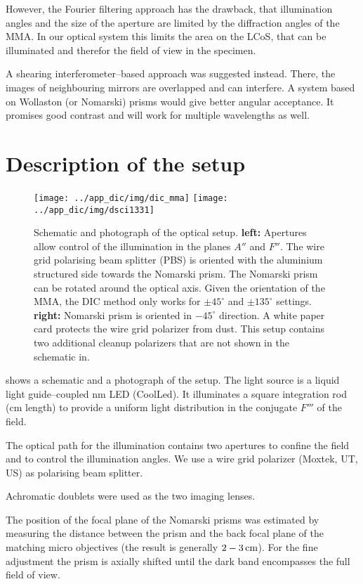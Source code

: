 However, the Fourier filtering approach has the drawback, that
illumination angles and the size of the aperture are limited by the
diffraction angles of the MMA. In our optical system this limits the
area on the LCoS, that can be illuminated and therefor the field of
view in the specimen. 

A shearing interferometer--based approach was suggested instead. There,
the images of neighbouring mirrors are overlapped and can interfere. A
system based on Wollaston (or Nomarski) prisms would give better
angular acceptance. It promises good contrast and will work for
multiple wavelengths as well.
\section{Description of the setup}
\begin{figure}[ht]
  \centering
  \texttt{[image: ../app\_dic/img/dic\_mma]}
  \texttt{[image: ../app\_dic/img/dsci1331]}
  \caption{ Schematic and photograph of the optical setup.  {\bf
      left:} Apertures allow control of the illumination in the planes
    $A''$ and $F''$. The wire grid polarising beam splitter (PBS) is
    oriented with the aluminium structured side towards the Nomarski
    prism. The Nomarski prism can be rotated around the optical
    axis. Given the orientation of the MMA, the DIC method only works
    for $\pm 45^\circ$ and $\pm 135^\circ$ settings.  {\bf right:}
    Nomarski prism is oriented in $-45^\circ$ direction.  A white
    paper card protects the wire grid polarizer from dust.  This setup
    contains two additional cleanup polarizers that are not shown in
    the schematic in.}
  \label{fig:dic_mma}
\end{figure}
 shows a schematic and a photograph of the setup.
The light source is a liquid light guide--coupled \unit[480]{nm} LED
(CoolLed). It illuminates a square integration rod (\unit[10]{cm}
length) to provide a uniform light distribution in the conjugate
$F'''$ of the field. 

The optical path for the illumination contains two apertures to
confine the field and to control the illumination angles. We use a
wire grid polarizer (Moxtek, UT, US) as polarising beam splitter.

Achromatic doublets were used as the two imaging lenses.

The position of the focal plane of the Nomarski prisms was estimated
by measuring the distance between the prism and the back focal plane
of the matching micro objectives (the result is generally
$\unit[2-3]{cm}$). For the fine adjustment the prism is axially
shifted until the dark band encompasses the full field of view.

